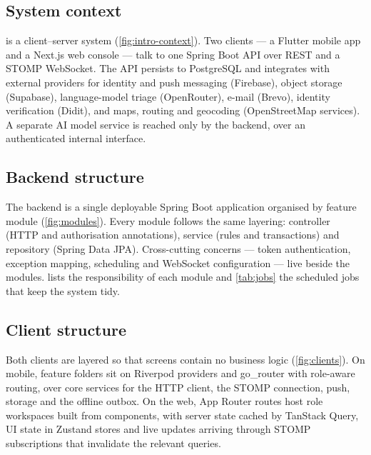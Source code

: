 \subsection{System context}
\ProjectName{} is a client--server system (\cref{fig:intro-context}). Two clients --- a Flutter mobile app and a Next.js web
console --- talk to one Spring Boot API over REST and a STOMP WebSocket. The API persists to PostgreSQL and integrates
with external providers for identity and push messaging (Firebase), object storage (Supabase), language-model
triage (OpenRouter), e-mail (Brevo), identity verification (Didit), and maps, routing and geocoding
(OpenStreetMap services). A separate AI model service is reached only by the backend, over an authenticated
internal interface.

\subsection{Backend structure}
The backend is a single deployable Spring Boot application organised by feature module (\cref{fig:modules}). Every
module follows the same layering: controller (HTTP and authorisation annotations), service (rules and
transactions) and repository (Spring Data JPA). Cross-cutting concerns --- token authentication, exception mapping,
scheduling and WebSocket configuration --- live beside the modules.  lists the responsibility of each
module and \cref{tab:jobs} the scheduled jobs that keep the system tidy.




\subsection{Client structure}
Both clients are layered so that screens contain no business logic (\cref{fig:clients}). On mobile, feature folders sit on
Riverpod providers and go\_router with role-aware routing, over core services for the HTTP client, the STOMP
connection, push, storage and the offline outbox. On the web, App Router routes host role workspaces built from
components, with server state cached by TanStack Query, UI state in Zustand stores and live updates arriving through
STOMP subscriptions that invalidate the relevant queries.


